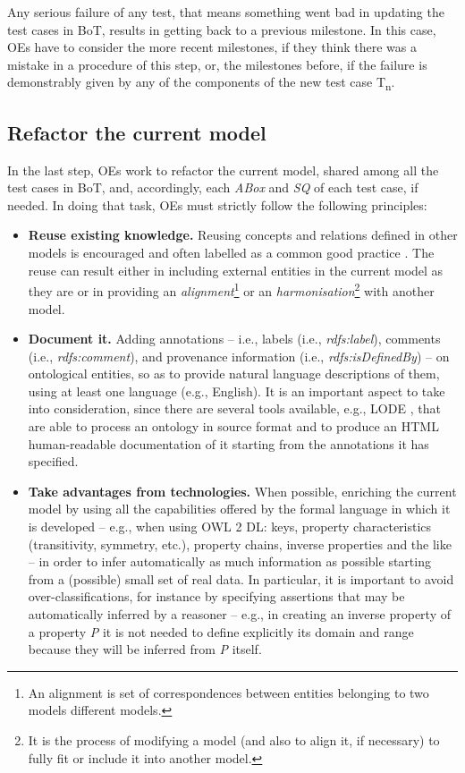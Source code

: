 \documentclass[runningheads,a4paper]{llncs}
\begin{document}
Any serious failure of any test, that means something went bad in updating the test cases in BoT, results in getting back to a previous milestone. In this case, OEs have to consider the more recent milestones, if they think there was a mistake in a procedure of this step, or, the milestones before, if the failure is demonstrably given by any of the components of the new test case T\textsubscript{n}.

\subsection{Refactor the current model}

In the last step, OEs work to refactor the current model, shared among all the test cases in BoT, and, accordingly, each {\em ABox} and {\em SQ} of each test case, if needed. In doing that task, OEs must strictly follow the following principles:
\begin{itemize}
\item {\bf Reuse existing knowledge.} Reusing concepts and relations defined in other models is encouraged and often labelled as a common good practice  \cite{__RefNumPara__2884_1461357291}. The reuse can result either in including external entities in the current model as they are or in providing an {\em alignment}\footnote{An alignment is set of correspondences between entities belonging to two models different models.} or an {\em harmonisation}\footnote{It is the process of modifying a model (and also to align it, if necessary) to fully fit or include it into another model.} with another model.
\item {\bf Document it.} Adding annotations -- i.e., labels (i.e., {\em rdfs:label}), comments (i.e., {\em rdfs:comment}), and provenance information (i.e., {\em rdfs:isDefinedBy}) -- on ontological entities, so as to provide natural language descriptions of them, using at least one language (e.g., English). It is an important aspect to take into consideration, since there are several tools available, e.g., LODE  \cite{__RefNumPara__4047_1461357291}, that are able to process an ontology in source format and to produce an HTML human-readable documentation of it starting from the annotations it has specified.
\item {\bf Take advantages from technologies.} When possible, enriching the current model by using all the capabilities offered by the formal language in which it is developed -- e.g., when using OWL 2 DL: keys, property characteristics (transitivity, symmetry, etc.), property chains, inverse properties and the like -- in order to infer automatically as much information as possible starting from a (possible) small set of real data. In particular, it is important to avoid over-classifications, for instance by specifying assertions that may be automatically inferred by a reasoner -- e.g., in creating an inverse property of a property {\em P} it is not needed to define explicitly its domain and range because they will be inferred from {\em P} itself.
\end{itemize}
\end{document}
